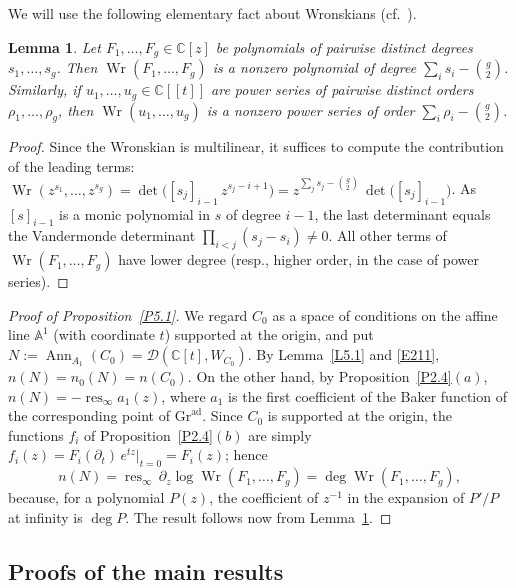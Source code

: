 \documentclass[11pt,reqno]{amsart}
\theoremstyle{plain}
\newtheorem{lemma}{Lemma}[section]
\theoremstyle{definition}
\theoremstyle{remark}
\numberwithin{equation}{section}
\newcommand{\cD}{\mathcal{D}}
\newcommand{\C}{\mathbb{C}}
\newcommand{\A}{\mathbb{A}}
\newcommand{\del}{\partial}
\newcommand{\Gra}{\mathrm{Gr}^{\mathrm{ad}}}
\newcommand{\ff}[2]{[#1]_{#2}}          %
\DeclareMathOperator{\Ann}{Ann}
\DeclareMathOperator{\Wr}{Wr}
\DeclareMathOperator{\res}{res}
\begin{document}
We will use the following elementary fact about Wronskians (cf.\
\cite[Proposition~2]{Hermoso2024}).

\begin{lemma}
\label{L5.2}
Let $F_1, \ldots, F_g \in \C[z]$ be polynomials of pairwise distinct degrees $s_1, \ldots, s_g$.
Then $\Wr(F_1, \ldots, F_g)$ is a nonzero polynomial of degree $\sum_{i} s_i - \binom{g}{2}$.
Similarly, if $u_1, \ldots, u_g \in \C[[t]]$ are power series of pairwise distinct orders
$\rho_1, \ldots, \rho_g$, then $\Wr(u_1, \ldots, u_g)$ is a nonzero power series of order
$\sum_i \rho_i - \binom{g}{2}$.
\end{lemma}

\begin{proof}
Since the Wronskian is multilinear, it suffices to compute the contribution of the leading
terms: $\Wr(z^{s_1}, \ldots, z^{s_g}) = \det\bigl(\ff{s_j}{i-1}\, z^{s_j - i + 1}\bigr) =
z^{\sum_j s_j - \binom{g}{2}}\, \det\bigl(\ff{s_j}{i-1}\bigr)$. As $\ff{s}{i-1}$ is a monic
polynomial in $s$ of degree $i-1$, the last determinant equals the Vandermonde determinant
$\prod_{i < j} (s_j - s_i) \ne 0$. All other terms of $\Wr(F_1, \ldots, F_g)$ have lower degree
(resp., higher order, in the case of power series).
\end{proof}

\begin{proof}[Proof of Proposition~\ref{P5.1}]
We regard $C_0$ as a space of conditions on the affine line $\A^1$ (with coordinate $t$) supported
at the origin, and put $N := \Ann_{A_1}(C_0) = \cD(\C[t], W_{C_0})$. By Lemma~\ref{L5.1} and
\eqref{E211}, $n(N) = n_0(N) = n(C_0)$. On the other hand, by Proposition~\ref{P2.4}$(a)$, $n(N) =
- \res_\infty a_1(z)$, where $a_1$ is the first coefficient of the Baker function of the
corresponding point of $\Gra$. Since $C_0$ is supported at the origin, the functions $f_i$ of
Proposition~\ref{P2.4}$(b)$ are simply $f_i(z) = F_i(\del_t)\, e^{tz}|_{t=0} = F_i(z)$; hence
\[
  n(N) = \res_\infty\, \del_z \log \Wr(F_1, \ldots, F_g) = \deg \Wr(F_1, \ldots, F_g) ,
\]
because, for a polynomial $P(z)$, the coefficient of $z^{-1}$ in the expansion of $P'/P$ at
infinity is $\deg P$. The result follows now from Lemma~\ref{L5.2}.
\end{proof}

\subsection{Proofs of the main results}
\label{S5.3}
\end{document}
